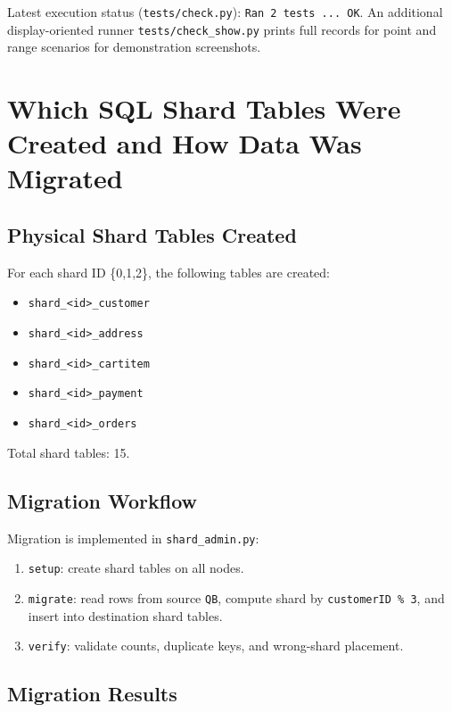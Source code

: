 \documentclass[12pt,a4paper]{article}
\begin{document}
Latest execution status (\texttt{tests/check.py}): \texttt{Ran 2 tests ... OK}.
An additional display-oriented runner \texttt{tests/check\_show.py} prints full
records for point and range scenarios for demonstration screenshots.

\section{Which SQL Shard Tables Were Created and How Data Was Migrated}

\subsection{Physical Shard Tables Created}

For each shard ID \{0,1,2\}, the following tables are created:

\begin{itemize}[leftmargin=*]
  \item \texttt{shard\_<id>\_customer}
  \item \texttt{shard\_<id>\_address}
  \item \texttt{shard\_<id>\_cartitem}
  \item \texttt{shard\_<id>\_payment}
  \item \texttt{shard\_<id>\_orders}
\end{itemize}

Total shard tables: 15.

\subsection{Migration Workflow}

Migration is implemented in \texttt{shard\_admin.py}:

\begin{enumerate}[leftmargin=*]
  \item \texttt{setup}: create shard tables on all nodes.
  \item \texttt{migrate}: read rows from source \texttt{QB}, compute shard by
  \texttt{customerID \% 3}, and insert into destination shard tables.
  \item \texttt{verify}: validate counts, duplicate keys, and wrong-shard placement.
\end{enumerate}

\subsection{Migration Results}
\end{document}
